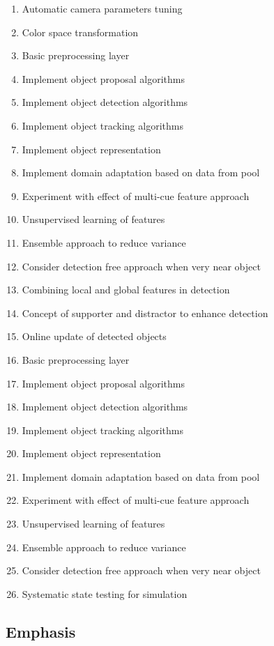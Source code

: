 \begin{enumerate}
    \item Automatic camera parameters tuning
    \item Color space transformation 
    \item Basic preprocessing layer
    \item Implement object proposal algorithms
    \item Implement object detection algorithms
    \item Implement object tracking algorithms
    \item Implement object representation
    \item Implement domain adaptation based on data from pool
    \item Experiment with effect of multi-cue feature approach
    \item Unsupervised learning of features
    \item Ensemble approach to reduce variance
    \item Consider detection free approach when very near object
    \item Combining local and global features in detection
    \item Concept of supporter and distractor to enhance detection
    \item Online update of detected objects
    \item Basic preprocessing layer
    \item Implement object proposal algorithms
    \item Implement object detection algorithms
    \item Implement object tracking algorithms
    \item Implement object representation
    \item Implement domain adaptation based on data from pool
    \item Experiment with effect of multi-cue feature approach
    \item Unsupervised learning of features
    \item Ensemble approach to reduce variance
    \item Consider detection free approach when very near object
    \item Systematic state testing for simulation
\end{enumerate}

\subsection{Emphasis}

